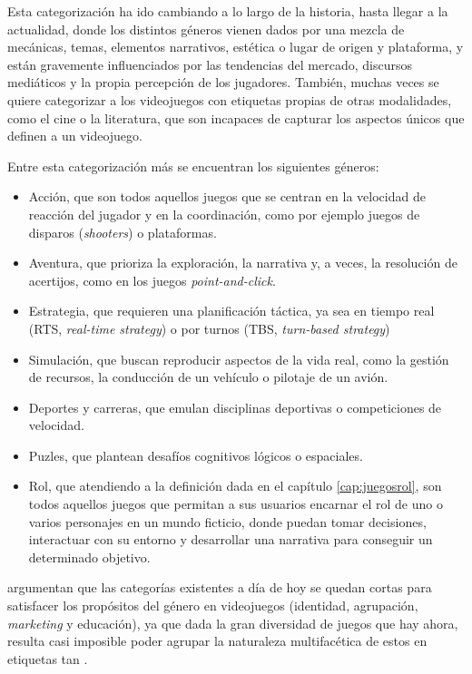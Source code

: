 \medskip

Esta categorización ha ido cambiando a lo largo de la historia, hasta llegar a la actualidad, donde los distintos géneros vienen dados por una mezcla de mecánicas, temas, elementos narrativos, estética o lugar de origen y plataforma, y están gravemente influenciados por las tendencias del mercado, discursos mediáticos y la propia percepción de los jugadores. También, muchas veces se quiere categorizar a los videojuegos con etiquetas propias de otras modalidades, como el cine o la literatura, que son incapaces de capturar los aspectos únicos que definen a un videojuego.

\smallskip

Entre esta categorización más  se encuentran los siguientes géneros:
\begin{itemize}
	\item Acción, que son todos aquellos juegos que se centran en la velocidad de reacción del jugador y en la coordinación, como por ejemplo juegos de disparos (\textit{shooters}) o plataformas.
	\item Aventura, que prioriza la exploración, la narrativa y, a veces, la resolución de acertijos, como en los juegos \textit{point-and-click}.
	\item Estrategia, que requieren una planificación táctica, ya sea en tiempo real (RTS, \textit{real-time strategy}) o por turnos (TBS, \textit{turn-based strategy})
	\item Simulación, que buscan reproducir aspectos de la vida real, como la gestión de recursos, la conducción de un vehículo o pilotaje de un avión.
	\item Deportes y carreras, que emulan disciplinas deportivas o competiciones de velocidad.
	\item Puzles, que plantean desafíos cognitivos lógicos o espaciales.
	\item Rol, que atendiendo a la definición dada en el capítulo \ref{cap:juegosrol}, son todos aquellos juegos que permitan a sus usuarios encarnar el rol de uno o varios personajes en un mundo ficticio, donde puedan tomar decisiones, interactuar con su entorno y desarrollar una narrativa para conseguir un determinado objetivo.
\end{itemize}

\medskip


\cite{FailGeneros} argumentan que las categorías existentes a día de hoy se quedan cortas para satisfacer los propósitos del género en videojuegos (identidad, agrupación, \textit{marketing} y educación), ya que dada la gran diversidad de juegos que hay ahora, resulta casi imposible poder agrupar la naturaleza multifacética de estos en etiquetas tan .

